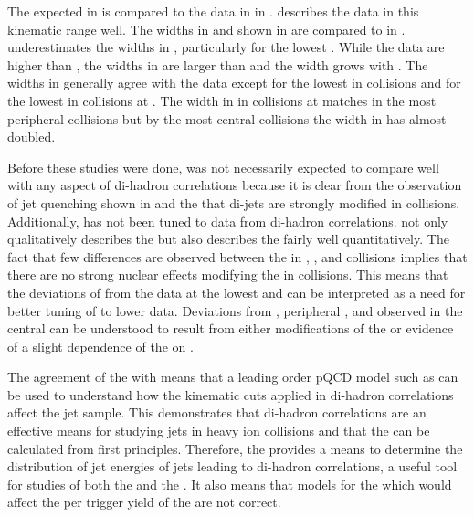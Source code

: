 The \jly expected in \py is compared to the data in  in .  \py describes the data in this kinematic range well.  The widths in \dphi and \deta shown in  are compared to \py in .  \py underestimates the widths in \dphi, particularly for the lowest \pttrig.  While the \dAu data are higher than \py, the widths in \AplusA are larger than \dAu and the width grows with \npart.  The widths in \deta generally agree with the data except for the lowest \ptassoc in \Cu collisions and for the lowest \pttrig in \Au collisions at \sNNtwohundred.  The width in \deta in \Au collisions at \sNNtwohundred matches \py in the most peripheral collisions but by the most central collisions the width in \deta has almost doubled.%

Before these studies were done, \py was not necessarily expected to compare well with any aspect of di-hadron correlations because it is clear from the observation of jet quenching shown in  and the \ridge that di-jets are strongly modified in \AplusA collisions.  Additionally, \py has not been tuned to data from di-hadron correlations.  \py not only qualitatively describes the \jlc but also describes the \jlc fairly well quantitatively.  The fact that few differences are observed between the \jlc in \dAu, \Cu, and \Au collisions implies that there are no strong nuclear effects modifying the \jlc in \AplusA collisions.  This means that the deviations of \py from the data at the lowest \pttrig and \ptassoc can be interpreted as a need for better tuning of \py to lower \pT data.  Deviations from \pp, peripheral \AplusA, and \py observed in the central \Au can be understood to result from either modifications of the \jlc or evidence of a slight dependence of the \ridge on \deta.

The agreement of the \jlc with \py means that a leading order pQCD model such as \py can be used to understand how the kinematic cuts applied in di-hadron correlations affect the jet sample.  This demonstrates that di-hadron correlations are an effective means for studying jets in heavy ion collisions and that the \jlc can be calculated from first principles.  Therefore, the \jlc provides a means to determine the distribution of jet energies of jets leading to di-hadron correlations, a useful tool for studies of both the \as and the \ridge.  It also means that models for the \ridge which would affect the per trigger yield of the \jlc are not correct.

